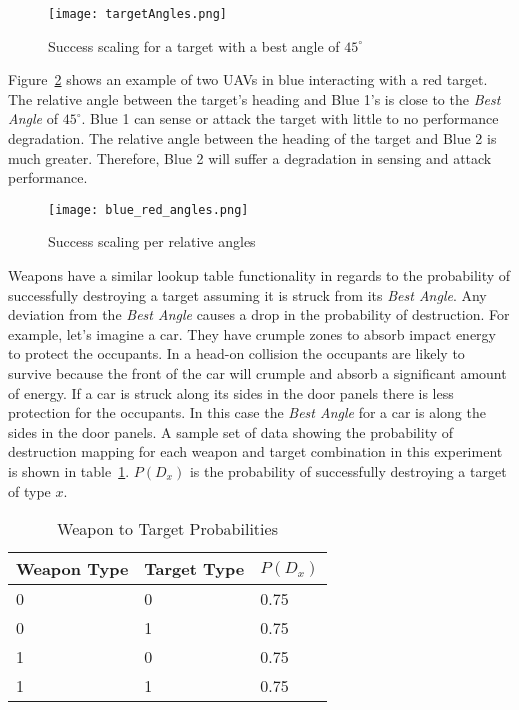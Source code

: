 
\begin{figure}[H]
	\centering
	\texttt{[image: targetAngles.png]}
	\caption{Success scaling for a target with a best angle of $45^{\circ}$}
	\label{fig:targetAngles}
\end{figure}

Figure~\ref{fig:blue_red_angles} shows an example of two UAVs in blue interacting with a red target.  The relative angle between the target's heading and Blue 1's is close to the \textit{Best Angle} of $45^{\circ}$.  Blue 1 can sense or attack the target with little to no performance degradation.  The relative angle between the heading of the target and Blue 2 is much greater.  Therefore, Blue 2 will suffer a degradation in sensing and attack performance.

\begin{figure}[H]
	\centering
	\texttt{[image: blue\_red\_angles.png]}
	\caption{Success scaling per relative angles}
	\label{fig:blue_red_angles}
\end{figure}


Weapons have a similar lookup table functionality in regards to the probability of successfully destroying a target assuming it is struck from its \textit{Best Angle}.  Any deviation from the \textit{Best Angle} causes a drop in the probability of destruction.  For example, let's imagine a car.  They have crumple zones to absorb impact energy to protect the occupants.  In a head-on collision the occupants are likely to survive because the front of the car will crumple and absorb a significant amount of energy.  If a car is struck along its sides in the door panels there is less protection for the occupants.  In this case the \textit{Best Angle} for a car is along the sides in the door panels. A sample set of data showing the probability of destruction mapping for each weapon and target combination in this experiment is shown in table~\ref{tab:wpnTgtProb}.  $P(D_{x})$ is the probability of successfully destroying a target of type $x$.

\begin{table}[H]
	\caption{Weapon to Target Probabilities}
	\centering
	\label{tab:wpnTgtProb}
	\begin{tabular}{|p{1.5cm}|p{1.5cm}|p{3cm}|}
		\hline
		Weapon Type & Target Type & $P(D_{x})$\\ \hline
		0 & 0 & 0.75 \\
		0 & 1 & 0.75 \\
		1 & 0 & 0.75 \\
		1 & 1 & 0.75 \\
		\hline
	\end{tabular}
\end{table}



